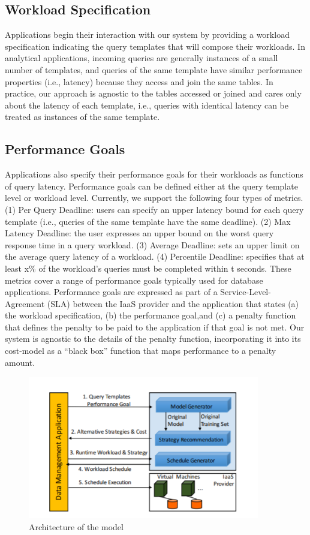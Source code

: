 \subsection{Workload Specification}
Applications begin their interaction with our system by providing a workload specification indicating the query templates  that will compose their workloads. In analytical applications, incoming queries are generally instances of a small number of templates, and queries of the same template have similar performance properties (i.e., latency) because they access and join the same tables. In practice, our approach is agnostic to the tables accessed or joined and cares only about the latency of each template, i.e., queries with identical latency can be treated as instances of the same template. 
\subsection{Performance Goals}
Applications also specify their performance goals for their workloads as functions of query latency. Performance goals can be defined either at the query template level or workload level. Currently, we support the following four types of metrics. (1) Per Query Deadline: users can specify an upper latency bound for each query template (i.e., queries of the same template have the same deadline). (2) Max Latency Deadline: the user expresses an upper bound on the worst query response time in a query workload. (3) Average Deadline: sets an upper limit on the average query latency of a workload. (4) Percentile Deadline: specifies that at least x\% of the workload’s queries must be completed within t seconds. These metrics cover a range of performance goals typically used for database applications. Performance goals are expressed as part of a Service-Level-Agreement (SLA) between the IaaS provider and the application that states (a) the workload specification, (b) the performance goal,and (c) a penalty function that defines the penalty to be paid to the application if that goal is not met. Our system is agnostic to the details of the penalty function, incorporating it into its cost-model as a “black box” function that maps performance to a penalty amount. 
\begin{figure}
\centering
\includegraphics[width=0.9\textwidth]{architecture.PNG}
\caption{\label{fig:Archi}Architecture of the model}
\end{figure}
